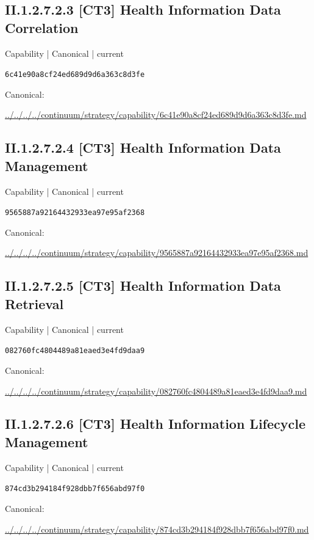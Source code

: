 \documentclass[10pt,a4paper]{article}
\begin{document}
\subsection*{II.1.2.7.2.3 [CT3] Health Information Data Correlation}
\label{element-6c41e90a8cf24ed689d9d6a363c8d3fe}
{\small Capability | Canonical | current}\par
\texttt{6c41e90a8cf24ed689d9d6a363c8d3fe}\par
Canonical: \par
{\footnotesize\url{../../../../continuum/strategy/capability/6c41e90a8cf24ed689d9d6a363c8d3fe.md}}\par
\subsection*{II.1.2.7.2.4 [CT3] Health Information Data Management}
\label{element-9565887a92164432933ea97e95af2368}
{\small Capability | Canonical | current}\par
\texttt{9565887a92164432933ea97e95af2368}\par
Canonical: \par
{\footnotesize\url{../../../../continuum/strategy/capability/9565887a92164432933ea97e95af2368.md}}\par
\subsection*{II.1.2.7.2.5 [CT3] Health Information Data Retrieval}
\label{element-082760fc4804489a81eaed3e4fd9daa9}
{\small Capability | Canonical | current}\par
\texttt{082760fc4804489a81eaed3e4fd9daa9}\par
Canonical: \par
{\footnotesize\url{../../../../continuum/strategy/capability/082760fc4804489a81eaed3e4fd9daa9.md}}\par
\subsection*{II.1.2.7.2.6 [CT3] Health Information Lifecycle Management}
\label{element-874cd3b294184f928dbb7f656abd97f0}
{\small Capability | Canonical | current}\par
\texttt{874cd3b294184f928dbb7f656abd97f0}\par
Canonical: \par
{\footnotesize\url{../../../../continuum/strategy/capability/874cd3b294184f928dbb7f656abd97f0.md}}\par
\end{document}
